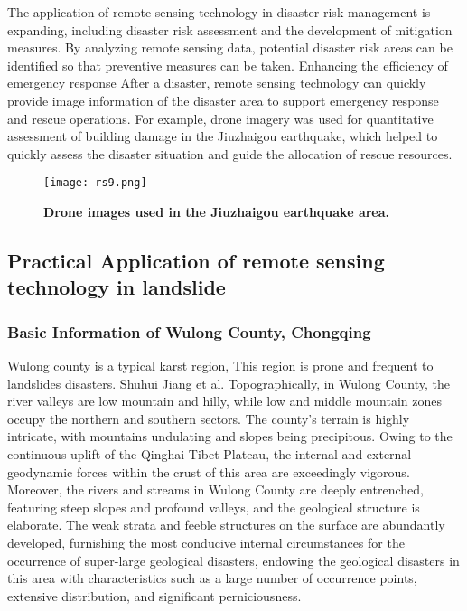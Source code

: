 \documentclass[conference]{IEEEtran}
\begin{document}
The application of remote sensing technology in disaster risk management is expanding, including disaster risk assessment and the development of mitigation measures. By analyzing remote sensing data, potential disaster risk areas can be identified so that preventive measures can be taken. Enhancing the efficiency of emergency response After a disaster, remote sensing technology can quickly provide image information of the disaster area to support emergency response and rescue operations. For example, drone imagery was used for quantitative assessment of building damage in the Jiuzhaigou earthquake\cite{b72}, which helped to quickly assess the disaster situation and guide the allocation of rescue resources.

\begin{figure}[h]
    \centering
    \texttt{[image: rs9.png]}
    \caption{\textbf{Drone images used in the Jiuzhaigou earthquake area.}}
    \label{fig:enter-label}
\end{figure}

\subsection{Practical Application of remote sensing technology in landslide}
\subsubsection{Basic Information of Wulong County, Chongqing}
Wulong county is a typical karst region, This region is prone and frequent to landslides disasters. Shuhui Jiang et al. \cite{b73}Topographically, in Wulong County, the river valleys are low mountain and hilly, while low and middle mountain zones occupy the northern and southern sectors. The county's terrain is highly intricate, with mountains undulating and slopes being precipitous. Owing to the continuous uplift of the Qinghai-Tibet Plateau, the internal and external geodynamic forces within the crust of this area are exceedingly vigorous. Moreover, the rivers and streams in Wulong County are deeply entrenched, featuring steep slopes and profound valleys, and the geological structure is elaborate. The weak strata and feeble structures on the surface are abundantly developed, furnishing the most conducive internal circumstances for the occurrence of super-large geological disasters, endowing the geological disasters in this area with characteristics such as a large number of occurrence points, extensive distribution, and significant perniciousness.
\end{document}
